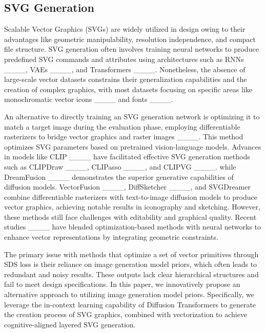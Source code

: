 \subsection{SVG Generation }
Scalable Vector Graphics (SVGs) are widely utilized in design owing to their advantages like geometric manipulability, resolution independence, and compact file structure. SVG generation often involves training neural networks to produce predefined SVG commands and attributes using architectures such as RNNs ____, VAEs ____, and Transformers ____. Nonetheless, the absence of large-scale vector datasets constrains their generalization capabilities and the creation of complex graphics, with most datasets focusing on specific areas like monochromatic vector icons ____ and fonts ____.

An alternative to directly training an SVG generation network is optimizing it to match a target image during the evaluation phase, employing differentiable rasterizers to bridge vector graphics and raster images ____. This method optimizes SVG parameters based on pretrained vision-language models. Advances in models like CLIP ____ have facilitated effective SVG generation methods such as CLIPDraw ____, CLIPasso ____, and CLIPVG ____. while DreamFusion ____ demonstrates the superior generative capabilities of diffusion models. VectorFusion ____, DiffSketcher ____, and SVGDreamer combine differentiable rasterizers with text-to-image diffusion models to produce vector graphics, achieving notable results in iconography and sketching. However, these methods still face challenges with editability and graphical quality. Recent studies ____ have blended optimization-based methods with neural networks to enhance vector representations by integrating geometric constraints. 

The primary issue with methods that optimize a set of vector primitives through SDS loss is their reliance on image generation model priors, which often leads to redundant and noisy results. These outputs lack clear hierarchical structures and fail to meet design specifications. In this paper, we innovatively propose an alternative approach to utilizing image generation model priors. Specifically, we leverage the in-context learning capability of Diffusion Transformers to generate the creation process of SVG graphics, combined with vectorization to achieve cognitive-aligned layered SVG generation.


